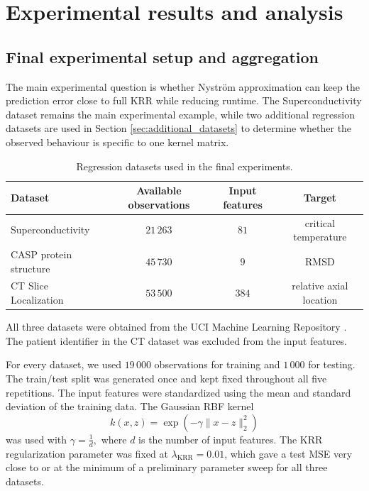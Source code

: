 \chapter{Experimental results and analysis}


\section{Final experimental setup and aggregation}

The main experimental question is whether Nystr\"om approximation can keep the prediction error close to full KRR while reducing runtime. The Superconductivity dataset remains the main experimental example, while two additional regression datasets are used in Section \ref{sec:additional_datasets} to determine whether the observed behaviour is specific to one kernel matrix.

\begin{table}[H]
\centering
\begin{tabular}{lccc}
\hline
Dataset & Available observations & Input features & Target \\
\hline
Superconductivity & $21\,263$ & $81$ & critical temperature \\
CASP protein structure & $45\,730$ & $9$ & RMSD \\
CT Slice Localization & $53\,500$ & $384$ & relative axial location \\
\hline
\end{tabular}
\caption{Regression datasets used in the final experiments.}
\label{tab:final_datasets}
\end{table}

All three datasets were obtained from the UCI Machine Learning Repository \citep{superconductivty_data_464, physicochemical_properties_of_protein_tertiary_structure_265, relative_location_of_ct_slices_on_axial_axis_206}. The patient identifier in the CT dataset was excluded from the input features.

For every dataset, we used $19\,000$ observations for training and $1\,000$ for testing. The train/test split was generated once and kept fixed throughout all five repetitions. The input features were standardized using the mean and standard deviation of the training data. The Gaussian RBF kernel
\[
k(x,z)=\exp(-\gamma\|x-z\|_2^2)
\]
was used with $\gamma=\frac{1}{d},$ where $d$ is the number of input features. The KRR regularization parameter was fixed at $\lambda_{\mathrm{KRR}}=0.01$, which gave a test MSE very close to or at the minimum of a preliminary parameter sweep for all three datasets.

